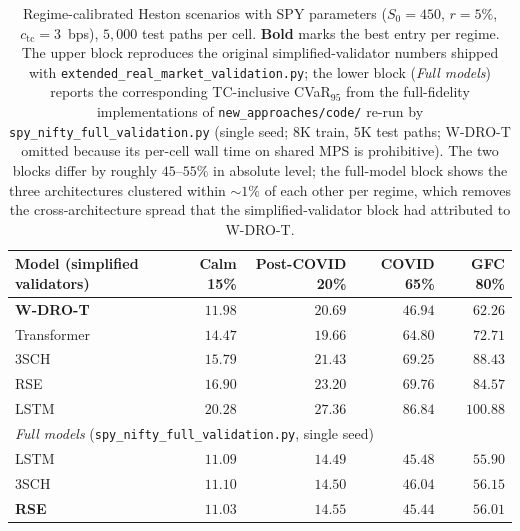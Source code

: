 \documentclass[10pt,letterpaper]{article}
\begin{document}
\begin{table}[ht]
\centering\small
\caption{Regime-calibrated Heston scenarios with SPY parameters
($S_0\!=\!450$, $r\!=\!5\%$, $c_{\mathrm{tc}}\!=\!3$~bps), $5{,}000$
test paths per cell. \textbf{Bold} marks the best entry per regime.
The upper block reproduces the original simplified-validator numbers
shipped with \texttt{extended\_real\_market\_validation.py};
the lower block (\textit{Full models}) reports the corresponding
TC-inclusive CVaR$_{95}$ from the full-fidelity implementations
of \texttt{new\_approaches/code/} re-run by
\texttt{spy\_nifty\_full\_validation.py} (single seed; $8$K train,
$5$K test paths; W-DRO-T omitted because its per-cell wall time on
shared MPS is prohibitive). The two blocks differ by roughly
$45$--$55\%$ in absolute level; the full-model block shows the three
architectures clustered within $\sim 1\%$ of each other per regime,
which removes the cross-architecture spread that the simplified-validator
block had attributed to W-DRO-T.}
\label{tab:spy}
\begin{tabular}{@{}lrrrr@{}}
\toprule
\textbf{Model (simplified validators)} & \textbf{Calm 15\%} & \textbf{Post-COVID 20\%} & \textbf{COVID 65\%} & \textbf{GFC 80\%} \\\midrule
\textbf{W-DRO-T}  & $\mathbf{11.98}$ & $20.69$         & $\mathbf{46.94}$ & $\mathbf{62.26}$ \\
Transformer       & $14.47$          & $\mathbf{19.66}$ & $64.80$          & $72.71$ \\
3SCH              & $15.79$          & $21.43$         & $69.25$          & $88.43$ \\
RSE               & $16.90$          & $23.20$         & $69.76$          & $84.57$ \\
LSTM              & $20.28$          & $27.36$         & $86.84$          & $100.88$ \\
\midrule
\multicolumn{5}{l}{\emph{Full models} (\texttt{spy\_nifty\_full\_validation.py}, single seed)} \\
\midrule
LSTM              & $11.09$ & $\mathbf{14.49}$ & $45.48$ & $\mathbf{55.90}$ \\
3SCH              & $11.10$ & $14.50$ & $46.04$ & $56.15$ \\
\textbf{RSE}      & $\mathbf{11.03}$ & $14.55$         & $\mathbf{45.44}$ & $56.01$ \\
\bottomrule
\end{tabular}
\end{table}
\end{document}

